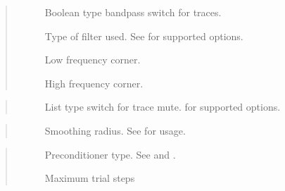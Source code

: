\documentclass[letterpaper,10pt,english]{sphinxmanual}
\begin{document}
\begin{quote}\begin{description}
\item[{}] \leavevmode
Boolean type bandpass switch for traces.

\item[{}] \leavevmode
Type of filter used. See {\hyperref[\detokenize{ref/seisflows.preprocess:sfpreprocess}]{}} for supported options.

\item[{}] \leavevmode
Low frequency corner.

\item[{}] \leavevmode
High frequency corner.

\end{description}\end{quote}

\begin{quote}\begin{description}
\item[{}] \leavevmode
List type switch for trace mute. {\hyperref[\detokenize{ref/seisflows.preprocess:sfpreprocess}]{}} for supported options.

\end{description}\end{quote}

\begin{quote}\begin{description}
\item[{}] \leavevmode
Smoothing radius. See  for usage.

\end{description}\end{quote}

\begin{quote}\begin{description}
\item[{}] \leavevmode
Preconditioner type. See {\hyperref[\detokenize{main/design_project:path}]{}} and {\hyperref[\detokenize{ref/seisflows.plugins.preconds:sfprecond}]{}}.

\item[{}] \leavevmode
Maximum trial steps

\end{description}\end{quote}
\end{document}
